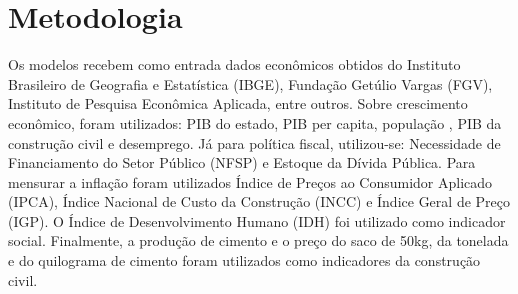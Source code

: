 
\chapter{Metodologia}

Os modelos recebem como entrada dados econômicos obtidos do Instituto Brasileiro de Geografia e Estatística (IBGE), Fundação Getúlio Vargas (FGV), Instituto de Pesquisa Econômica Aplicada, entre outros. Sobre crescimento econômico, foram utilizados: PIB do estado, PIB per capita, população , PIB da construção civil e desemprego. Já para política fiscal, utilizou-se: Necessidade de Financiamento do Setor Público (NFSP) e Estoque da Dívida Pública. Para mensurar a inflação foram utilizados Índice de Preços ao Consumidor Aplicado (IPCA), Índice Nacional de Custo da Construção (INCC) e Índice Geral de Preço (IGP). O Índice de Desenvolvimento Humano (IDH) foi utilizado como indicador social. Finalmente, a produção de cimento e o preço do saco de 50kg, da tonelada e do quilograma de cimento foram utilizados como indicadores da construção civil.


